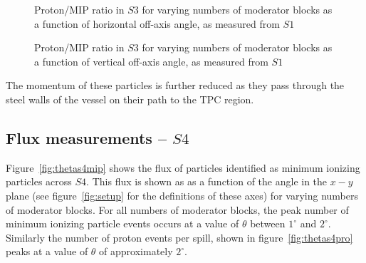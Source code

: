 \begin{figure}[!ht]
  \begin{minipage}[t]{0.48\textwidth}
    \begin{adjustbox}{max totalsize={\textwidth}{.35\textheight}, center}
      
    \end{adjustbox}
    \caption{Proton/MIP ratio in $\mathit{S3}$ for varying numbers of moderator blocks as a function of horizontal off-axis angle, as measured from $\mathit{S1}$}
    \label{fig:propiratio_s3_horz}
  \end{minipage}
  \hspace{0.3cm}
  \begin{minipage}[t]{0.48\textwidth}
    \begin{adjustbox}{max totalsize={\textwidth}{.35\textheight}, center}
      
    \end{adjustbox}
    \caption{Proton/MIP ratio in $\mathit{S3}$ for varying numbers of moderator blocks as a function of vertical off-axis angle, as measured from $\mathit{S1}$}
    \label{fig:propiratio_s3_vert}
  \end{minipage}	
\end{figure}

The momentum of these particles is further reduced as they pass through the steel walls of the vessel on their path to the TPC region.

\subsection{Flux measurements -- $\mathit{S4}$}

Figure~\ref{fig:thetas4mip} shows the flux of particles identified as minimum ionizing particles across $\mathit{S4}$.
This flux is shown as as a function of the angle in the $x-y$ plane (see figure~\ref{fig:setup} for the definitions of these axes) for varying numbers of moderator blocks.
For all numbers of moderator blocks, the peak number of minimum ionizing particle events occurs at a value of $\theta$ between $1^{\circ}$ and $2^{\circ}$.
Similarly the number of proton events per spill, shown in figure~\ref{fig:thetas4pro} peaks at a value of $\theta$ of approximately $2^{\circ}$.


